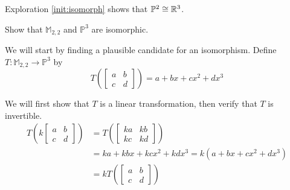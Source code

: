 \documentclass{ximera}
\begin{document}
\begin{example}\label{ex:p2isor3}
Exploration \ref{init:isomorph} shows that $\mathbb{P}^2\cong\mathbb{R}^3$.  
\end{example}



\begin{example}\label{ex:isomorphexample1}
Show that $\mathbb{M}_{2,2}$ and $\mathbb{P}^3$ are isomorphic.
\begin{explanation}
We will start by finding a plausible candidate for an isomorphism.  Define $T:\mathbb{M}_{2,2}\rightarrow \mathbb{P}^3$ by
$$T\left(\begin{bmatrix}a&b\\c&d\end{bmatrix}\right)=a+bx+cx^2+dx^3$$

We will first show that $T$ is a linear transformation,  then verify that $T$ is invertible.
\begin{align*}
    T\left(k\begin{bmatrix}a&b\\c&d\end{bmatrix}\right)&=T\left(\begin{bmatrix}ka&kb\\kc&kd\end{bmatrix}\right)\\
    &=ka+kbx+kcx^2+kdx^3=k(a+bx+cx^2+dx^3)\\
    &=kT\left(\begin{bmatrix}a&b\\c&d\end{bmatrix}\right)
\end{align*}


\end{explanation}
\end{example}
\end{document}
